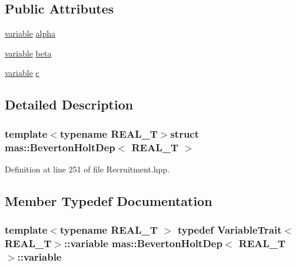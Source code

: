 \subsection*{Public Attributes}
\begin{DoxyCompactItemize}
\item 
\hyperlink{structmas_1_1_beverton_holt_dep_a9d24addbd81435aa63224f31f4b96fd3}{variable} \hyperlink{structmas_1_1_beverton_holt_dep_aa3c39a19325434f7f76448365fd66744}{alpha}
\item 
\hyperlink{structmas_1_1_beverton_holt_dep_a9d24addbd81435aa63224f31f4b96fd3}{variable} \hyperlink{structmas_1_1_beverton_holt_dep_a35104d09d811c33f724b94dcad050916}{beta}
\item 
\hyperlink{structmas_1_1_beverton_holt_dep_a9d24addbd81435aa63224f31f4b96fd3}{variable} \hyperlink{structmas_1_1_beverton_holt_dep_abe85a3970eb878c0c5fd0f2a4027bb10}{c}
\end{DoxyCompactItemize}


\subsection{Detailed Description}
\subsubsection*{template$<$typename R\-E\-A\-L\-\_\-\-T$>$struct mas\-::\-Beverton\-Holt\-Dep$<$ R\-E\-A\-L\-\_\-\-T $>$}



Definition at line 251 of file Recruitment.\-hpp.



\subsection{Member Typedef Documentation}
\hypertarget{structmas_1_1_beverton_holt_dep_a9d24addbd81435aa63224f31f4b96fd3}{
\subsubsection[{variable}]{\setlength{\rightskip}{0pt plus 5cm}template$<$typename R\-E\-A\-L\-\_\-\-T $>$ typedef {\bf Variable\-Trait}$<$R\-E\-A\-L\-\_\-\-T$>$\-::{\bf variable} {\bf mas\-::\-Beverton\-Holt\-Dep}$<$ R\-E\-A\-L\-\_\-\-T $>$\-::{\bf variable}}}\label{structmas_1_1_beverton_holt_dep_a9d24addbd81435aa63224f31f4b96fd3}


